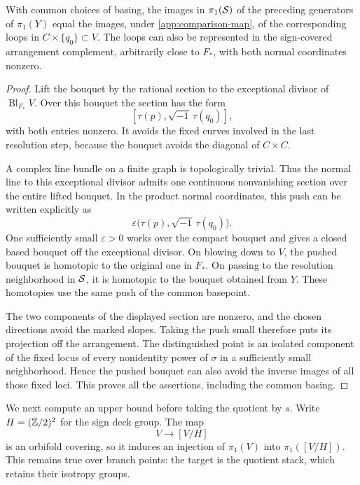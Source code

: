 \begin{lemma}\label{app:surface-comparison}
With common choices of basing, the images in $\pi_1(\mathcal S)$ of the
preceding generators of $\pi_1(Y)$ equal the images, under
\eqref{app:comparison-map}, of the corresponding loops in
$C\times\{q_0\}\subset V$.  The loops can also be represented in the
sign-covered arrangement complement, arbitrarily close to $F_*$, with
both normal coordinates nonzero.
\end{lemma}

\begin{proof}
Lift the bouquet by the rational section to the exceptional divisor of
$\operatorname{Bl}_{F_*}V$.  Over this bouquet the section has the form
\[
 [\tau(p),\sqrt{-1}\,\tau(q_0)],
\]
with both entries nonzero.  It avoids the fixed curves involved in the
last resolution step, because the bouquet avoids the diagonal of
$C\times C$.

A complex line bundle on a finite graph is topologically trivial.
Thus the normal line to this exceptional divisor admits one continuous
nonvanishing section over the entire lifted bouquet.  In the product normal coordinates, this push can be written
explicitly as
\[
 \varepsilon\bigl(\tau(p),\sqrt{-1}\,\tau(q_0)\bigr).
\]
One sufficiently small $\varepsilon>0$ works over the compact bouquet
and gives a closed based bouquet off the exceptional divisor.  On blowing down to $V$, the pushed bouquet is
homotopic to the original one in $F_*$.  On passing to the resolution
neighborhood in $\mathcal S$, it is homotopic to the bouquet obtained from
$Y$.  These homotopies use the same push of the common basepoint.

The two components of the displayed section are nonzero, and the
chosen directions avoid the marked slopes.  Taking the push small
therefore puts its projection off the arrangement.  The distinguished
point is an isolated component of the fixed locus of every nonidentity
power of $\sigma$ in a sufficiently small neighborhood.  Hence the
pushed bouquet can also avoid the inverse images of all those fixed
loci.  This proves all the assertions, including the common basing.
\end{proof}

We next compute an upper bound before taking the quotient by $s$.
Write $H=(\mathbb Z/2)^2$ for the sign deck group.  The map
\[
 V\longrightarrow[V/H]
\]
is an orbifold covering, so it induces an injection of $\pi_1(V)$ into
$\pi_1([V/H])$.  This remains true over branch points: the target is the
quotient stack, which retains their isotropy groups.

